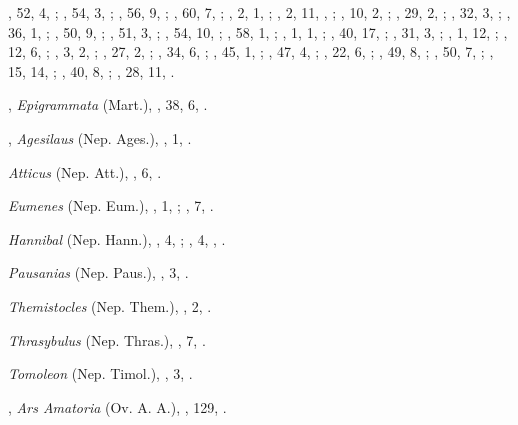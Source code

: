 \begin{autindex}
    , 52,  4, ;
    , 54,  3, ;
    , 56,  9, ;
    , 60,  7, ;
    ,  2,  1, ;
    ,  2, 11, , ;
    , 10,  2, ;
    , 29,  2, ;
    , 32,  3, ;
    , 36,  1, ;
    , 50,  9, ;
    , 51,  3, ;
    , 54, 10, ;
    , 58,  1, ;
    ,  1,  1, ;
    , 40, 17, ;
    , 31,  3, ;
    ,  1, 12, ;
    , 12,  6, ;
    ,  3,  2, ;
    , 27,  2, ;
    , 34,  6, ;
    , 45,  1, ;
    , 47,  4, ;
    , 22,  6, ;
    , 49,  8, ;
    , 50,  7, ;
    , 15, 14, ;
    , 40,  8, ;
    , 28, 11, .

\indexspace

,
  \subitem \emph{Epigrammata} (Mart.),
    , 38, 6, .

\indexspace

,
  \subitem \emph{Agesilaus} (Nep. Ages.),
    , 1, .

  \subitem \emph{Atticus} (Nep. Att.),
    , 6, .

  \subitem \emph{Eumenes} (Nep. Eum.),
    , 1, ;
    , 7, .

  \subitem \emph{Hannibal} (Nep. Hann.),
    , 4, ;
    , 4, , .

  \subitem \emph{Pausanias} (Nep. Paus.),
    , 3, .

  \subitem \emph{Themistocles} (Nep. Them.),
    , 2, .

  \subitem \emph{Thrasybulus} (Nep. Thras.),
    , 7, .

  \subitem \emph{Tomoleon} (Nep. Timol.),
    , 3, .

\indexspace

,
  \subitem \emph{Ars Amatoria} (Ov. A. A.),
    , 129, .


\end{autindex}

